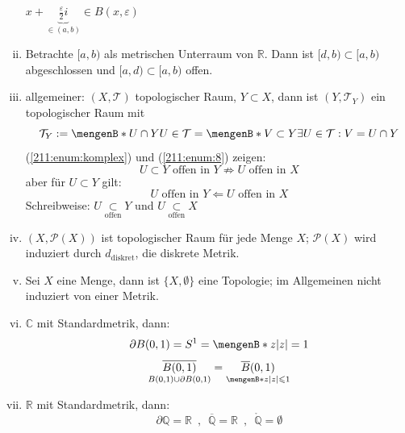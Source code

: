 \begin{enumerate}[(i)]
	\begin{figure}[ht]
	\end{figure}
	$x + \underbrace{\frac{\varepsilon}{2} i}_{\in (a,b)} \in B(x, \varepsilon) $
	\item \label{211:enum:8} Betrachte $[a,b)$ als metrischen Unterraum von $\mathds{R}$. Dann ist $[d,b) \subset [a,b)$ abgeschlossen und $[a,d) \subset [a,b)$ offen.
	\item allgemeiner: $(X,\mathcal{T})$ topologischer Raum, $Y \subset X$, dann ist $(Y, \mathcal{T}_Y)$ ein topologischer Raum mit 
	\[
		\mathcal{T}_Y := \set[U \cap Y]{U \in \mathcal{T}} = \set[V \subset Y]{\exists U \in \mathcal{T} : V = U  \cap Y} 
	\]
	(\ref{211:enum:komplex}) und (\ref{211:enum:8}) zeigen:
	\[
		U \subset Y \text{ offen in }Y \not\Rightarrow U \text{ offen in } X
	\]
	aber für $U \subset Y$ gilt: 
	\[
		U \text{ offen in } Y \Leftarrow U \text{ offen in } X
	\]
	Schreibweise: $U \underset{\text{offen}}{\subset} Y$ und $U \underset{\text{offen}}{\subset} X$
	\item $(X, \mathcal{P}(X))$ ist topologischer Raum für jede Menge $X$; $\mathcal{P}(X)$ wird induziert durch $d_{\text{diskret}}$, die diskrete Metrik.
	\item Sei $X$ eine Menge, dann ist $\{X, \emptyset \}$ eine Topologie; im Allgemeinen nicht induziert von einer Metrik.
	\item $\mathds{C}$ mit Standardmetrik, dann:
	\[
		\partial B(0,1) = S^1 = \set[z]{\abs*{z}=1} 
	\]
	\[
		\underset{B(0,1) \cup \partial B(0,1)}{\overline{B(0,1)}} = \underset{ \set[z]{\abs*{z}  \le 1 } }{\overline{B}(0,1)}
	\]
	\item $\mathds{R}$ mit Standardmetrik, dann:
	\[
		\partial \mathds{Q} = \mathds{R} \enspace, \enspace \overline{\mathds{Q}} = \mathds{R} \enspace, \enspace \mathring{\mathds{Q}}= \emptyset 
	\]
\end{enumerate}

